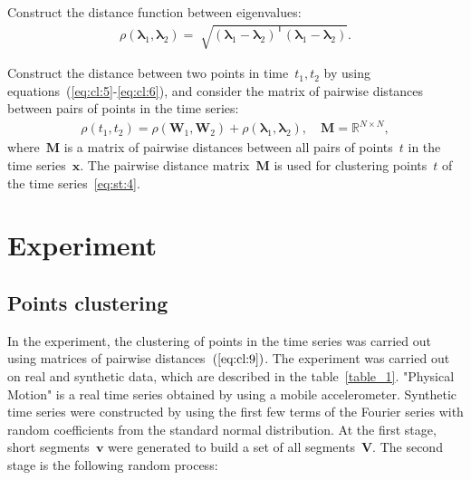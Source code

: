 \documentclass[12pt, twoside]{article}
\numberwithin{equation}{section}
\begin{document}
Construct the distance function between eigenvalues:
\begin{equation}
\label{eq:cl:6}
\begin{aligned}
\rho\left(\bm{\lambda}_1, \bm{\lambda}_2\right) = \sqrt[]{\left(\bm{\lambda}_1 - \bm{\lambda}_2\right)^{\mathsf{T}}\left(\bm{\lambda}_1 - \bm{\lambda}_2\right)}.
\end{aligned}
\end{equation}

Construct the distance between two points in time~$t_1, t_2$ by using equations~(\ref{eq:cl:5}-\ref{eq:cl:6}), and consider the matrix of pairwise distances between pairs of points in the time series:
\begin{equation}
\label{eq:cl:9}
\begin{aligned}
\rho\left(t_1, t_2\right) = \rho\left(\textbf{W}_1, \textbf{W}_2\right) + \rho\left(\bm{\lambda}_1, \bm{\lambda}_2\right), \quad \textbf{M} =  \mathbb{R}^{N\times N},
\end{aligned}
\end{equation}
where~$\textbf{M}$ is a matrix of pairwise distances between all pairs of points~$t$ in the time series~$\textbf{x}$.
The pairwise distance matrix~$\textbf{M}$ is used for clustering points~$t$ of the time series~\eqref{eq:st:4}.

\section{Experiment}
\subsection{Points clustering}
In the experiment, the clustering of points in the time series was carried out using matrices of pairwise distances~$(\ref{eq:cl:9})$. 
The experiment was carried out on real and synthetic data, which are described in the table~\ref{table_1}. 
"Physical Motion" is a real time series obtained by using a mobile accelerometer. 
Synthetic time series were constructed by using the first few terms of the Fourier series with random coefficients from the standard normal distribution.
At the first stage, short segments~$\textbf{v}$ were generated to build a set of all segments~$\mathbf{V}$.
The second stage is the following random process:
\end{document}

